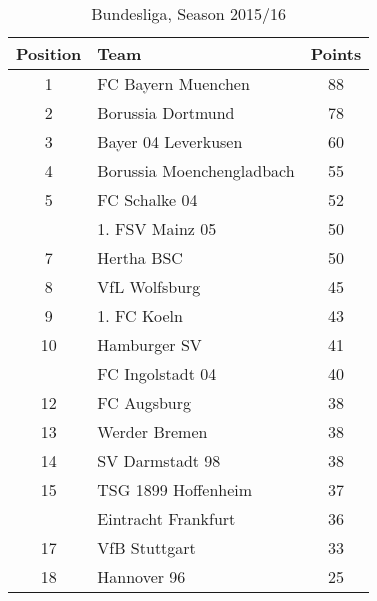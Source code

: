 \documentclass[
]{article}
\begin{document}
\begin{table}

\caption{\label{tab:unnamed-chunk-2}Bundesliga, Season 2015/16}
\centering
\begin{tabular}[t]{clc}
\toprule
Position & Team & Points\\
\midrule
1 & FC Bayern Muenchen & 88\\
2 & Borussia Dortmund & 78\\
3 & Bayer 04 Leverkusen & 60\\
4 & Borussia Moenchengladbach & 55\\
5 & FC Schalke 04 & 52\\
\addlinespace
6 & 1. FSV Mainz 05 & 50\\
7 & Hertha BSC & 50\\
8 & VfL Wolfsburg & 45\\
9 & 1. FC Koeln & 43\\
10 & Hamburger SV & 41\\
\addlinespace
11 & FC Ingolstadt 04 & 40\\
12 & FC Augsburg & 38\\
13 & Werder Bremen & 38\\
14 & SV Darmstadt 98 & 38\\
15 & TSG 1899 Hoffenheim & 37\\
\addlinespace
16 & Eintracht Frankfurt & 36\\
17 & VfB Stuttgart & 33\\
18 & Hannover 96 & 25\\
\bottomrule
\end{tabular}
\end{table}
\end{document}
